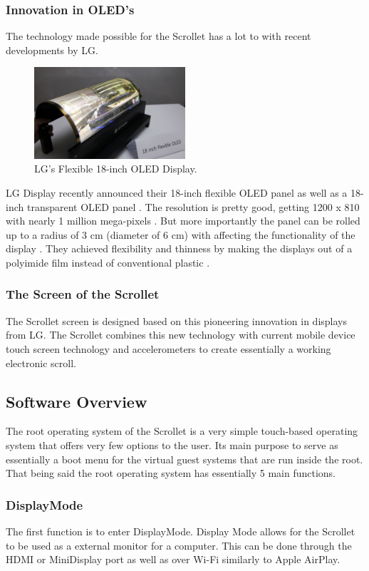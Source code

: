 \documentclass[a4paper]{article}
\begin{document}
\subsubsection{Innovation in OLED's}
The technology made possible for the Scrollet has a lot to with recent developments by LG.
\begin{figure}[H]
\centering
\includegraphics[width=0.5\textwidth]{lgoled.jpg}
\caption{LG's Flexible 18-inch OLED Display.}
\end{figure}
LG Display recently announced their 18-inch flexible OLED panel as well as a 18-inch transparent OLED panel \cite{LG}. The resolution is pretty good, getting 1200 x 810 with nearly 1 million mega-pixels \cite{LG}. But more importantly the panel can be rolled up to a radius of 3 cm (diameter of 6 cm) with affecting the functionality of the display \cite{LG}. They achieved flexibility and thinness by making the displays out of a polyimide film instead of conventional plastic \cite{LG}.

\subsubsection{The Screen of the Scrollet}
The Scrollet screen is designed based on this pioneering innovation in displays from LG. The Scrollet combines this new technology with current mobile device touch screen technology and accelerometers to create essentially a working electronic scroll.

\subsection{Software Overview}
The root operating system of the Scrollet is a very simple touch-based operating system that offers very few options to the user. Its main purpose to serve as essentially a boot menu for the virtual guest systems that are run inside the root. That being said the root operating system has essentially 5 main functions.

\subsubsection{DisplayMode}
The first function is to enter DisplayMode. Display Mode allows for the Scrollet to be used as a external monitor for a computer. This can be done through the HDMI or MiniDisplay port as well as over Wi-Fi similarly to Apple AirPlay.
\end{document}

